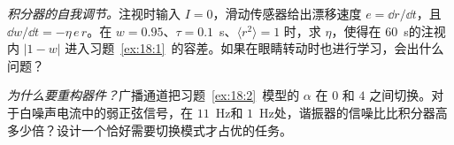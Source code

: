 \begin{exercise}[\lvlB]
\label{ex:18:6}
\emph{积分器的自我调节。}注视时输入 $I=0$，滑动传感器给出漂移速度 $e=\dd r/\dd t$，且 $\dd w/\dd t=-\eta\,e\,r$。在 $w=0.95$、$\tau=0.1$~s、$\langle r^2\rangle=1$ 时，求 $\eta$，使得在 $60$~s的注视内 $|1-w|$ 进入习题~\ref{ex:18:1}~的容差。如果在眼睛转动时也进行学习，会出什么问题？
\end{exercise}

\begin{exercise}[\lvlC]
\label{ex:18:7}
\emph{为什么要重构器件？}广播通道把习题~\ref{ex:18:2}~模型的 $\alpha$ 在 $0$ 和 $4$ 之间切换。对于白噪声电流中的弱正弦信号，在 $11$~Hz和 $1$~Hz处，谐振器的信噪比比积分器高多少倍？设计一个恰好需要切换模式才占优的任务。
\end{exercise}
